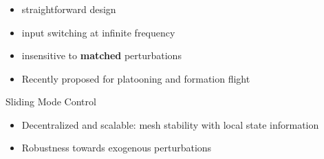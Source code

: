 \documentclass[12pt,svgnames,table,draft=false]{beamer}
\begin{document}
\begin{frame}\frametitle{}
\centering

\begin{tcolorbox}[colback=blue!5!white,colframe=blue!75!black,title=Ideal Sliding Mode Control, width=20em,
standard jigsaw,
opacityback=.7]
\begin{itemize}
\item straightforward design
\item input switching at infinite frequency
\item insensitive to \textbf{matched} perturbations
\item Recently proposed for platooning \cite{Fahimi2007} and formation flight \cite{galzi2006uav}
\end{itemize}
\end{tcolorbox}

\end{frame}


\usebackgroundtemplate{}
\begin{frame}{Sliding Mode Control}
\centering

\begin{tcolorbox}[colback=blue!5!white,colframe=blue!75!black,title=Potential Benefits, width=20em,
standard jigsaw,
opacityback=.7]
\begin{itemize}
\item Decentralized and scalable: mesh stability with local state information
\item Robustness towards exogenous perturbations
\end{itemize}
\end{tcolorbox}
\end{frame}
\end{document}
